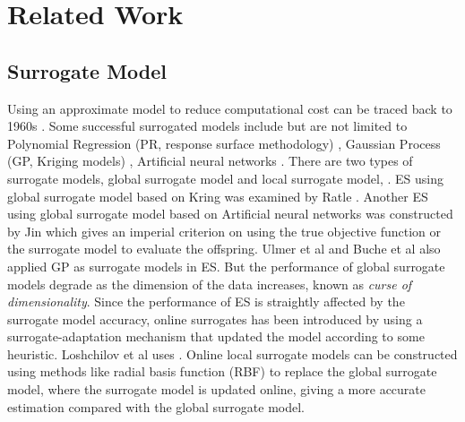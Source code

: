 \section{Related Work}

\subsection{Surrogate Model} 

Using an approximate model to reduce computational cost can be traced back to 1960s \cite{dunham1963design}. Some successful surrogated models include but are not limited to Polynomial Regression (PR, response surface methodology) \cite{doi:10.1080/00401706.1966.10490404}, Gaussian Process (GP, Kriging models) \cite{sacks1989}, Artificial neural networks \cite{Smith:1993:NNS:583180}. There are two types of surrogate models, global surrogate model and local surrogate model, . ES using global surrogate model based on Kring was examined by Ratle \cite{Ratle:2001:KSF:966173.966177}. Another ES using global surrogate model based on Artificial neural networks was constructed by Jin \cite{Jin02aframework} which gives an imperial criterion on using the true objective function or the surrogate model to evaluate the offspring. Ulmer et al \cite{Ulmer03evolutionstrategies} and Buche et al \cite{1424193} also applied GP as surrogate models in ES. But the performance of global surrogate models degrade as the dimension of the data increases, known as \textit{curse of dimensionality}. Since the performance of ES is straightly affected by the surrogate model accuracy, online surrogates has been introduced by using a surrogate-adaptation mechanism that updated the model according to some heuristic. Loshchilov et al \cite{loshchilov2012self} uses .
Online local surrogate models \cite{4033013} can be constructed using methods like radial basis function (RBF) \cite{GIANNAKOGLOU200243} to replace the global surrogate model, where the surrogate model is updated online, giving a more accurate estimation compared with the global surrogate model.







